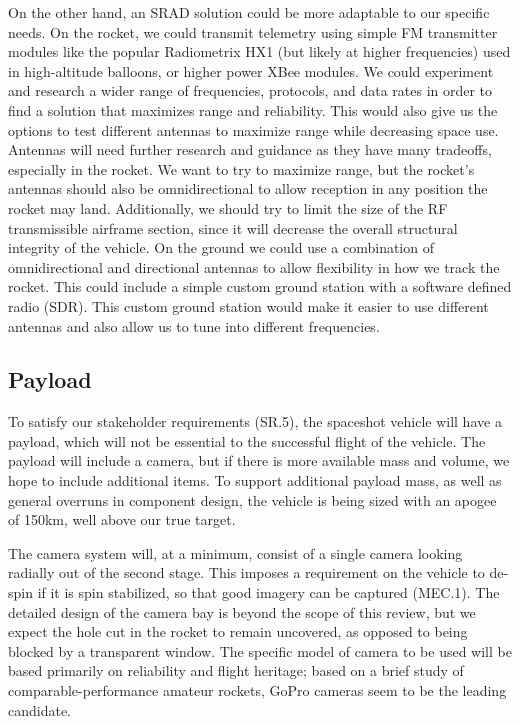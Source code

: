 On the other hand, an SRAD solution could be more adaptable to our specific needs. On the rocket, we could transmit telemetry using simple FM transmitter modules like the popular Radiometrix HX1 (but likely at higher frequencies) used in high-altitude balloons, or higher power XBee modules. We could experiment and research a wider range of frequencies, protocols, and data rates in order to find a solution that maximizes range and reliability. This would also give us the options to test different antennas to maximize range while decreasing space use.  Antennas will need further research and guidance as they have many tradeoffs, especially in the rocket. We want to try to maximize range, but the rocket’s antennas should also be omnidirectional to allow reception in any position the rocket may land. Additionally, we should try to limit the size of the RF transmissible airframe section, since it will decrease the overall structural integrity of the vehicle. On the ground we could use a combination of omnidirectional and directional antennas to allow flexibility in how we track the rocket. This could include a simple custom ground station with a software defined radio (SDR). This custom ground station would make it easier to use different antennas and also allow us to tune into different frequencies.


\subsection{Payload}
To satisfy our stakeholder requirements (SR.5), the spaceshot vehicle will have a payload, which will not be essential to the successful flight of the vehicle. The payload will include a camera, but if there is more available mass and volume,  we hope to include additional items. To support additional payload mass, as well as general overruns in component design, the vehicle is being sized with an apogee of 150km, well above our true target.

The camera system will, at a minimum, consist of a single camera looking radially out of the second stage. This imposes a requirement on the vehicle to de-spin if it is spin stabilized, so that good imagery can be captured (MEC.1). The detailed design of the camera bay is beyond the scope of this review, but we expect the hole cut in the rocket to remain uncovered, as opposed to being blocked by a transparent window. The specific model of camera to be used will be based primarily on reliability and flight heritage; based on a brief study of comparable-performance amateur rockets, GoPro cameras seem to be the leading candidate.

